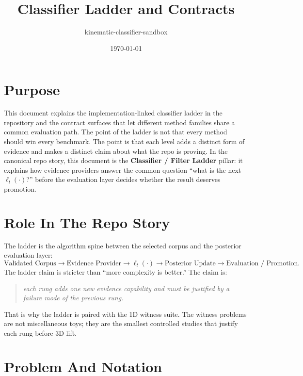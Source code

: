 \documentclass[11pt]{article}
\title{Classifier Ladder and Contracts}
\author{kinematic-classifier-sandbox}
\date{\today}
\begin{document}
\maketitle

\section{Purpose}

This document explains the implementation-linked classifier ladder in the
repository and the contract surfaces that let different method families share a
common evaluation path. The point of the ladder is not that every method should
win every benchmark. The point is that each level adds a distinct form of
evidence and makes a distinct claim about what the repo is proving. In the
canonical repo story, this document is the \textbf{Classifier / Filter Ladder}
pillar: it explains how evidence providers answer the common question ``what is
the next \(\ell_t(\cdot)\)?'' before the evaluation layer decides whether the
result deserves promotion.

\section{Role In The Repo Story}

The ladder is the algorithm spine between the selected corpus and the posterior
evaluation layer:
\begin{equation}
\text{Validated Corpus}
\rightarrow
\text{Evidence Provider}
\rightarrow
\ell_t(\cdot)
\rightarrow
\text{Posterior Update}
\rightarrow
\text{Evaluation / Promotion}.
\end{equation}
The ladder claim is stricter than ``more complexity is better.'' The claim is:
\begin{quote}
\textit{each rung adds one new evidence capability and must be justified by a
failure mode of the previous rung.}
\end{quote}
That is why the ladder is paired with the 1D witness suite. The witness
problems are not miscellaneous toys; they are the smallest controlled studies
that justify each rung before 3D lift.

\section{Problem And Notation}
\end{document}
